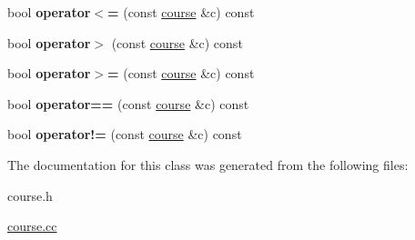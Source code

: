 \begin{DoxyCompactItemize}
\item 
bool {\bfseries operator$<$=} (const \hyperlink{classcourse}{course} \&c) const \hypertarget{classcourse_a6416d3083ef57cca7ed77f260f48dc11}{}\label{classcourse_a6416d3083ef57cca7ed77f260f48dc11}

\item 
bool {\bfseries operator$>$} (const \hyperlink{classcourse}{course} \&c) const \hypertarget{classcourse_a3d4e2681ba4f3ada21b2375129dbdae6}{}\label{classcourse_a3d4e2681ba4f3ada21b2375129dbdae6}

\item 
bool {\bfseries operator$>$=} (const \hyperlink{classcourse}{course} \&c) const \hypertarget{classcourse_a3ca9c58c57cb82c195656648ee0dacab}{}\label{classcourse_a3ca9c58c57cb82c195656648ee0dacab}

\item 
bool {\bfseries operator==} (const \hyperlink{classcourse}{course} \&c) const \hypertarget{classcourse_a9902543488788e4d53cd4614ed52ad25}{}\label{classcourse_a9902543488788e4d53cd4614ed52ad25}

\item 
bool {\bfseries operator!=} (const \hyperlink{classcourse}{course} \&c) const \hypertarget{classcourse_a7e598f9d46bd8ac668c2f3429f065446}{}\label{classcourse_a7e598f9d46bd8ac668c2f3429f065446}

\end{DoxyCompactItemize}


The documentation for this class was generated from the following files\+:\begin{DoxyCompactItemize}
\item 
course.\+h\item 
\hyperlink{course_8cc}{course.\+cc}\end{DoxyCompactItemize}
